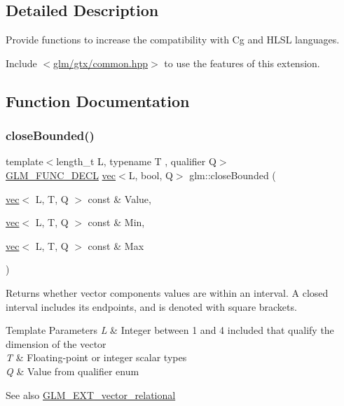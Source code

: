 \subsection{Detailed Description}
Provide functions to increase the compatibility with Cg and H\+L\+SL languages. 

Include $<$\hyperlink{gtx_2common_8hpp}{glm/gtx/common.\+hpp}$>$ to use the features of this extension. 

\subsection{Function Documentation}
\mbox{\label{group__gtx__common_gab7d89c14c48ad01f720fb5daf8813161}} 
\subsubsection{\texorpdfstring{close\+Bounded()}{closeBounded()}}
{\footnotesize\ttfamily template$<$length\+\_\+t L, typename T , qualifier Q$>$ \\
\hyperlink{setup_8hpp_ab2d052de21a70539923e9bcbf6e83a51}{G\+L\+M\+\_\+\+F\+U\+N\+C\+\_\+\+D\+E\+CL} \hyperlink{structglm_1_1vec}{vec}$<$L, bool, Q$>$ glm\+::close\+Bounded (\begin{DoxyParamCaption}\item[{\hyperlink{structglm_1_1vec}{vec}$<$ L, T, Q $>$ const \&}]{Value,  }\item[{\hyperlink{structglm_1_1vec}{vec}$<$ L, T, Q $>$ const \&}]{Min,  }\item[{\hyperlink{structglm_1_1vec}{vec}$<$ L, T, Q $>$ const \&}]{Max }\end{DoxyParamCaption})}

Returns whether vector components values are within an interval. A closed interval includes its endpoints, and is denoted with square brackets.


\begin{DoxyTemplParams}{Template Parameters}
{\em L} & Integer between 1 and 4 included that qualify the dimension of the vector \\
\hline
{\em T} & Floating-\/point or integer scalar types \\
\hline
{\em Q} & Value from qualifier enum\\
\hline
\end{DoxyTemplParams}
\begin{DoxySeeAlso}{See also}
\hyperlink{group__ext__vector__relational}{G\+L\+M\+\_\+\+E\+X\+T\+\_\+vector\+\_\+relational} 
\end{DoxySeeAlso}
\mbox{\label{group__gtx__common_gae5e80425df9833164ad469e83b475fb4}} 
